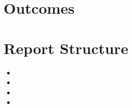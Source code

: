 \section{Outcomes} %

\section{Report Structure}
\begin{itemize}
    \item 
    \item 
    \item 
    \item 
\end{itemize}
